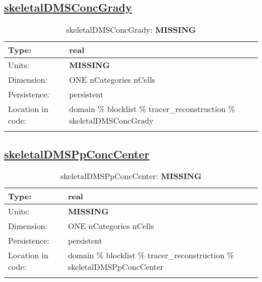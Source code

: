 \subsection[skeletalDMSConcGrady]{\hyperref[sec:var_tab_tracer_reconstruction]{skeletalDMSConcGrady}}
\label{subsec:var_sec_tracer_reconstruction_skeletalDMSConcGrady}
\begin{center}
\begin{longtable}{| p{2.0in} | p{4.0in} |}
        \hline 
        Type: & real \\
        \hline 
        Units: & {\bf \color{red} MISSING} \\
        \hline 
        Dimension: & ONE nCategories nCells \\
        \hline 
        Persistence: & persistent \\
        \hline 
         Location in code: & domain \% blocklist \% tracer\_reconstruction \% skeletalDMSConcGrady \\
         \hline 
    \caption{skeletalDMSConcGrady: {\bf \color{red} MISSING}}
\end{longtable}
\end{center}
\subsection[skeletalDMSPpConcCenter]{\hyperref[sec:var_tab_tracer_reconstruction]{skeletalDMSPpConcCenter}}
\label{subsec:var_sec_tracer_reconstruction_skeletalDMSPpConcCenter}
\begin{center}
\begin{longtable}{| p{2.0in} | p{4.0in} |}
        \hline 
        Type: & real \\
        \hline 
        Units: & {\bf \color{red} MISSING} \\
        \hline 
        Dimension: & ONE nCategories nCells \\
        \hline 
        Persistence: & persistent \\
        \hline 
         Location in code: & domain \% blocklist \% tracer\_reconstruction \% skeletalDMSPpConcCenter \\
         \hline 
    \caption{skeletalDMSPpConcCenter: {\bf \color{red} MISSING}}
\end{longtable}
\end{center}
